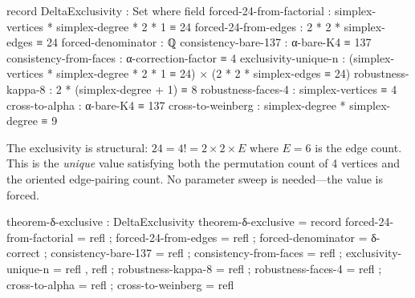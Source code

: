 \documentclass[11pt,a4paper]{book}
\begin{document}
\begin{code}
record DeltaExclusivity : Set where
  field
    forced-24-from-factorial   : simplex-vertices * simplex-degree * 2 * 1 ≡ 24
    forced-24-from-edges       : 2 * 2 * simplex-edges ≡ 24
    forced-denominator         : ℚ
    consistency-bare-137       : α-bare-K4 ≡ 137
    consistency-from-faces     : α-correction-factor ≡ 4
    exclusivity-unique-n       : (simplex-vertices * simplex-degree * 2 * 1 ≡ 24) × (2 * 2 * simplex-edges ≡ 24)
    robustness-kappa-8         : 2 * (simplex-degree + 1) ≡ 8
    robustness-faces-4         : simplex-vertices ≡ 4
    cross-to-alpha             : α-bare-K4 ≡ 137
    cross-to-weinberg          : simplex-degree * simplex-degree ≡ 9
\end{code}

The exclusivity is structural: $24 = 4! = 2 \times 2 \times E$ where $E = 6$ is the edge 
count. This is the \emph{unique} value satisfying both the permutation count of 4 vertices 
and the oriented edge-pairing count. No parameter sweep is needed---the value is forced.

\begin{code}
theorem-δ-exclusive : DeltaExclusivity
theorem-δ-exclusive = record
  { forced-24-from-factorial = refl
  ; forced-24-from-edges = refl
  ; forced-denominator = δ-correct
  ; consistency-bare-137 = refl
  ; consistency-from-faces = refl
  ; exclusivity-unique-n = refl , refl
  ; robustness-kappa-8 = refl
  ; robustness-faces-4 = refl
  ; cross-to-alpha = refl
  ; cross-to-weinberg = refl
  }

\end{code}
\end{document}
